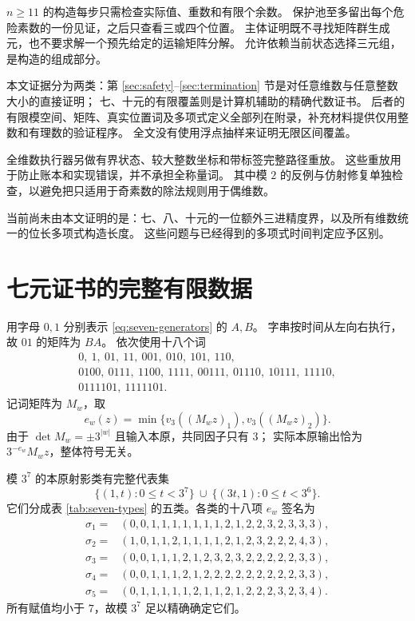 \documentclass[UTF8,fontset=fandol,zihao=-4,a4paper]{ctexart}
\numberwithin{equation}{section}
\theoremstyle{definition}
\begin{document}
$n\ge11$ 的构造每步只需检查实际值、重数和有限个余数。
保护池至多留出每个危险素数的一份见证，之后只查看三或四个位置。
主体证明既不寻找矩阵群生成元，也不要求解一个预先给定的运输矩阵分解。
允许依赖当前状态选择三元组，是构造的组成部分。

本文证据分为两类：第 \ref{sec:safety}--\ref{sec:termination} 节是对任意维数与任意整数大小的直接证明；
七、十元的有限覆盖则是计算机辅助的精确代数证书。
后者的有限模空间、矩阵、真实位置词及多项式定义全部列在附录，补充材料提供仅用整数和有理数的验证程序。
全文没有使用浮点抽样来证明无限区间覆盖。

全维数执行器另做有界状态、较大整数坐标和带标签完整路径重放。
这些重放用于防止账本和实现错误，并不承担全称量词。
其中模 $2$ 的反例与仿射修复单独检查，以避免把只适用于奇素数的除法规则用于偶维数。

当前尚未由本文证明的是：七、八、十元的一位额外三进精度界，以及所有维数统一的位长多项式构造长度。
这些问题与已经得到的多项式时间判定应予区别。

\appendix
\section{七元证书的完整有限数据}\label{app:seven}

用字母 $0,1$ 分别表示 \eqref{eq:seven-generators} 的 $A,B$。
字串按时间从左向右执行，故 $01$ 的矩阵为 $BA$。
依次使用十八个词
\begin{equation}\label{eq:seven-words}
\begin{gathered}
0,\ 1,\ 01,\ 11,\ 001,\ 010,\ 101,\ 110,\\
0100,\ 0111,\ 1100,\ 1111,\ 00111,\ 01110,\ 10111,\ 11110,\\
0111101,\ 1111101.
\end{gathered}
\end{equation}
记词矩阵为 $M_w$，取
\[
 e_w(z)=\min\{v_3((M_wz)_1),v_3((M_wz)_2)\}.
\]
由于 $\det M_w=\pm3^{|w|}$ 且输入本原，共同因子只有 $3$；
实际本原输出恰为 $3^{-e_w}M_wz$，整体符号无关。

模 $3^7$ 的本原射影类有完整代表集
\[
 \{(1,t):0\le t<3^7\}\ \cup\
 \{(3t,1):0\le t<3^6\}.
\]
它们分成表 \ref{tab:seven-types} 的五类。各类的十八项 $e_w$ 签名为
\begin{align*}
\sigma_1={}&(0,0,1,1,1,1,1,1,1,2,1,2,2,3,2,3,3,3),\\
\sigma_2={}&(1,0,1,1,2,1,1,1,1,2,1,2,3,2,2,2,4,3),\\
\sigma_3={}&(0,0,1,1,1,2,1,2,3,2,3,2,2,2,2,2,3,3),\\
\sigma_4={}&(0,0,1,1,1,2,1,2,2,2,2,2,2,2,2,2,3,3),\\
\sigma_5={}&(0,1,1,1,1,1,2,1,1,2,1,2,2,2,3,2,3,4).
\end{align*}
所有赋值均小于 $7$，故模 $3^7$ 足以精确确定它们。
\end{document}
